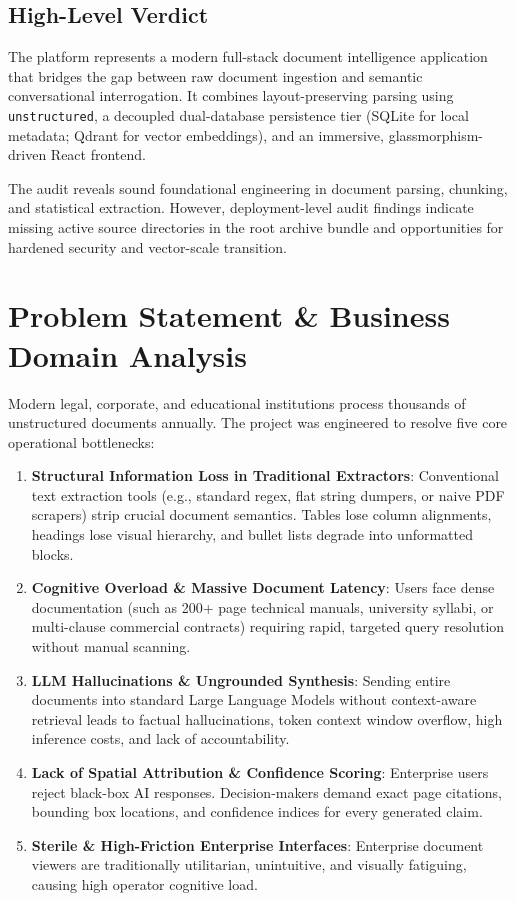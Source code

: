 \documentclass[11pt,a4paper]{article}
\begin{document}
\subsection{High-Level Verdict}
The platform represents a modern full-stack document intelligence application that bridges the gap between raw document ingestion and semantic conversational interrogation. It combines layout-preserving parsing using \texttt{unstructured}, a decoupled dual-database persistence tier (SQLite for local metadata; Qdrant for vector embeddings), and an immersive, glassmorphism-driven React frontend. 

The audit reveals sound foundational engineering in document parsing, chunking, and statistical extraction. However, deployment-level audit findings indicate missing active source directories in the root archive bundle and opportunities for hardened security and vector-scale transition.

\section{Problem Statement \& Business Domain Analysis}

Modern legal, corporate, and educational institutions process thousands of unstructured documents annually. The project was engineered to resolve five core operational bottlenecks:

\begin{enumerate}[leftmargin=*]
    \item \textbf{Structural Information Loss in Traditional Extractors}: Conventional text extraction tools (e.g., standard regex, flat string dumpers, or naive PDF scrapers) strip crucial document semantics. Tables lose column alignments, headings lose visual hierarchy, and bullet lists degrade into unformatted blocks.
    \item \textbf{Cognitive Overload \& Massive Document Latency}: Users face dense documentation (such as 200+ page technical manuals, university syllabi, or multi-clause commercial contracts) requiring rapid, targeted query resolution without manual scanning.
    \item \textbf{LLM Hallucinations \& Ungrounded Synthesis}: Sending entire documents into standard Large Language Models without context-aware retrieval leads to factual hallucinations, token context window overflow, high inference costs, and lack of accountability.
    \item \textbf{Lack of Spatial Attribution \& Confidence Scoring}: Enterprise users reject black-box AI responses. Decision-makers demand exact page citations, bounding box locations, and confidence indices for every generated claim.
    \item \textbf{Sterile \& High-Friction Enterprise Interfaces}: Enterprise document viewers are traditionally utilitarian, unintuitive, and visually fatiguing, causing high operator cognitive load.
\end{enumerate}
\end{document}

